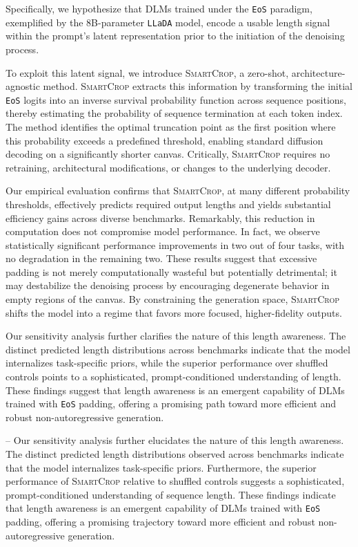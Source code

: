 \documentclass{article}
\theoremstyle{plain}
\theoremstyle{definition}
\theoremstyle{remark}
\begin{document}
Specifically, we hypothesize that DLMs trained under the \texttt{EoS} paradigm, exemplified by the 8B-parameter \texttt{LLaDA} model, encode a usable length signal within the prompt's latent representation prior to the initiation of the denoising process. 

To exploit this latent signal, we introduce \textsc{SmartCrop}, a zero-shot, architecture-agnostic method. \textsc{SmartCrop} extracts this information by transforming the initial \texttt{EoS} logits into an inverse survival probability function across sequence positions, thereby estimating the probability of sequence termination at each token index. The method identifies the optimal truncation point as the first position where this probability exceeds a predefined threshold, enabling standard diffusion decoding on a significantly shorter canvas. Critically, \textsc{SmartCrop} requires no retraining, architectural modifications, or changes to the underlying decoder.

Our empirical evaluation confirms that \textsc{SmartCrop}, at many different probability thresholds, effectively predicts required output lengths and yields substantial efficiency gains across diverse benchmarks. Remarkably, this reduction in computation does not compromise model performance. In fact, we observe statistically significant performance improvements in two out of four tasks, with no degradation in the remaining two. These results suggest that excessive padding is not merely computationally wasteful but potentially detrimental; it may destabilize the denoising process by encouraging degenerate behavior in empty regions of the canvas. By constraining the generation space, \textsc{SmartCrop} shifts the model into a regime that favors more focused, higher-fidelity outputs.

Our sensitivity analysis further clarifies the nature of this length awareness. The distinct predicted length distributions across benchmarks indicate that the model internalizes task-specific priors, while the superior performance over shuffled controls points to a sophisticated, prompt-conditioned understanding of length. These findings suggest that length awareness is an emergent capability of DLMs trained with \texttt{EoS} padding, offering a promising path toward more efficient and robust non-autoregressive generation.

--
Our sensitivity analysis further elucidates the nature of this length awareness. The distinct predicted length distributions observed across benchmarks indicate that the model internalizes task-specific priors. Furthermore, the superior performance of \textsc{SmartCrop} relative to shuffled controls suggests a sophisticated, prompt-conditioned understanding of sequence length. These findings indicate that length awareness is an emergent capability of DLMs trained with \texttt{EoS} padding, offering a promising trajectory toward more efficient and robust non-autoregressive generation.
\end{document}
